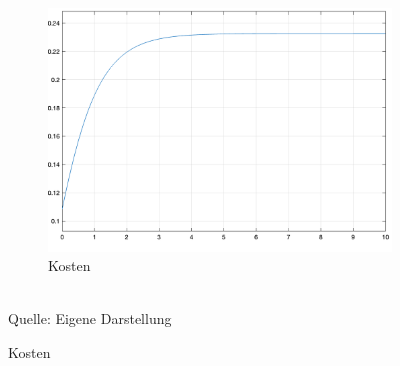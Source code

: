 \begin{figure}[h]
\begin{subfigure}[b]{0.32\textwidth}
    \includegraphics[width=\textwidth]{abbildungen/hnn_simulation_3_kostenfunktion.png}
    \caption{Kosten}
  \end{subfigure}
  \\
  Quelle: Eigene Darstellung
  \label{fig:Simulation HNN 3}
\end{figure}
